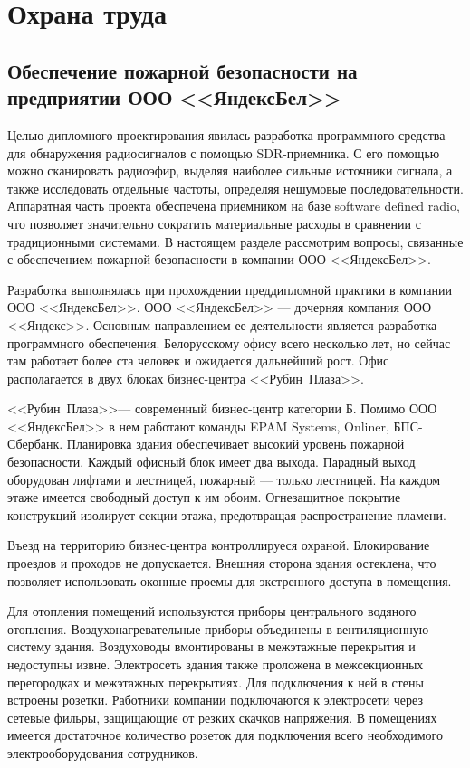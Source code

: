 \newcommand{\yandex}{ООО \mbox{<<Яндекс>>}}
\newcommand{\yandexbel}{ООО \mbox{<<ЯндексБел>>}}
\newcommand{\rubinplaza}{\mbox{<<Рубин Плаза>>}}

\section{Охрана труда}

\subsection[Обеспечение пожарной безопасности на предприятии]{Обеспечение пожарной безопасности на предприятии \yandexbel{}}

Целью дипломного проектирования явилась разработка программного средства для обнаружения радиосигналов с помощью SDR-приемника. С его помощью можно сканировать радиоэфир, выделяя наиболее сильные источники сигнала, а также исследовать отдельные частоты, определяя нешумовые последовательности. Аппаратная часть проекта обеспечена приемником на базе software defined radio, что позволяет значительно сократить материальные расходы в сравнении с традиционными системами. В настоящем разделе рассмотрим вопросы, связанные с обеспечением пожарной безопасности в компании \yandexbel{}.

Разработка выполнялась при прохождении преддипломной практики в компании \yandexbel{}. \yandexbel{} --- дочерняя компания \yandex{}. Основным направлением ее деятельности является разработка программного обеспечения. Белорусскому офису всего несколько лет, но сейчас там работает более ста человек и ожидается дальнейший рост. Офис располагается в двух блоках бизнес-центра \rubinplaza{}.

\rubinplaza --- современный бизнес-центр категории Б. Помимо \yandexbel{} в нем работают команды EPAM Systems, Onliner, БПС-Сбербанк. Планировка здания обеспечивает высокий уровень пожарной безопасности. Каждый офисный блок имеет два выхода. Парадный выход оборудован лифтами и лестницей, пожарный --- только лестницей. На каждом этаже имеется свободный доступ к им обоим. Огнезащитное покрытие конструкций изолирует секции этажа, предотвращая распространение пламени.

Въезд на территорию бизнес-центра контроллируеся охраной. Блокирование проездов и проходов не допускается. Внешняя сторона здания остеклена, что позволяет использовать оконные проемы для экстренного доступа в помещения.

Для отопления помещений используются приборы центрального водяного отопления. Воздухонагревательные приборы объединены в вентиляционную систему здания. Воздуховоды вмонтированы в межэтажные перекрытия и недоступны извне. Электросеть здания также проложена в межсекционных перегородках и межэтажных перекрытиях. Для подключения к ней в стены встроены розетки. Работники компании подключаются к электросети через сетевые фильры, защищающие от резких скачков напряжения. В помещениях имеется достаточное количество розеток для подключения всего необходимого электрооборудования сотрудников.

